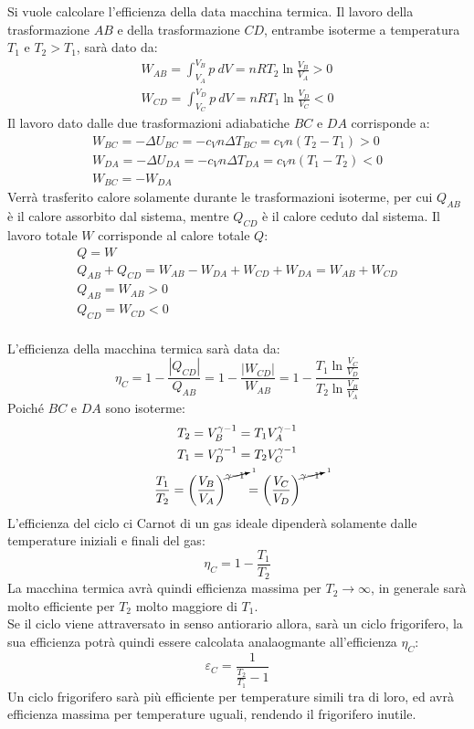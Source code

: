 \documentclass{article}
\numberwithin{equation}{subsection}
\begin{document}
Si vuole calcolare l'efficienza della data macchina termica. Il 
lavoro della trasformazione $AB$ e della trasformazione $CD$, entrambe isoterme a temperatura $T_1$ e $T_2>T_1$, sarà dato da: 
\begin{gather*}
    W_{AB}=\int_{V_A}^{V_B}p\:dV=nRT_2\ln\displaystyle\frac{V_B}{V_A}>0\\
    W_{CD}=\int_{V_C}^{V_D}p\:dV=nRT_1\ln\displaystyle\frac{V_D}{V_C}<0
\end{gather*}
Il lavoro dato dalle due trasformazioni adiabatiche $BC$ e $DA$ corrisponde a:
\begin{gather*}
    W_{BC}=-\Delta U_{BC}=-c_Vn\Delta T_{BC}=c_Vn(T_2-T_1)>0\\
    W_{DA}=-\Delta U_{DA}=-c_Vn\Delta T_{DA}=c_Vn(T_1-T_2)<0\\
    W_{BC}=-W_{DA}
\end{gather*}
Verrà trasferito calore solamente durante le trasformazioni isoterme, per cui 
$Q_{AB}$ è il calore assorbito dal sistema, mentre $Q_{CD}$ è il calore 
ceduto dal sistema. Il lavoro totale $W$ corrisponde al calore totale $Q$:
\begin{gather*}
    Q=W\\
    Q_{AB}+Q_{CD}=W_{AB}-W_{DA}+W_{CD}+W_{DA}=W_{AB}+W_{CD}\\
    Q_{AB}=W_{AB}>0\\
    Q_{CD}=W_{CD}<0
\end{gather*}
\\
L'efficienza della macchina termica sarà data da:
\begin{equation*}
    \eta_C=1-\displaystyle\frac{|Q_{CD}|}{Q_{AB}}=1-\frac{|W_{CD}|}{W_{AB}}=1-\frac{T_1\ln\displaystyle\frac{V_C}{V_D}}{T_2\ln\displaystyle\frac{V_B}{V_A}}
\end{equation*}
Poiché $BC$ e $DA$ sono isoterme:
\begin{gather*}
    T_2=V_B^{\gamma-1}=T_1V_A^{\gamma-1}\\
    T_1=V_D^{\gamma-1}=T_2V_C^{\gamma-1}\\
    \displaystyle\frac{T_1}{T_2}=\left(\frac{V_B}{V_A}\right)^{\cancelto{1}{\gamma-1}}=\left(\frac{V_C}{V_D}\right)^{\cancelto{1}{\gamma-1}}
\end{gather*}
L'efficienza del ciclo ci Carnot di un gas ideale dipenderà solamente dalle temperature iniziali e finali del gas:
\begin{equation}
    \eta_C=1-\displaystyle\frac{T_1}{T_2}
\end{equation}
La macchina termica avrà quindi efficienza massima per $T_2\to\infty$, 
in generale sarà molto efficiente per $T_2$ molto maggiore di $T_1$.
\\
Se il ciclo viene attraversato in senso antiorario allora, sarà un ciclo 
frigorifero, la sua efficienza potrà quindi essere calcolata 
analaogmante all'efficienza $\eta_C$:
\begin{equation}
    \varepsilon_C=\displaystyle\frac{1}{\displaystyle\frac{T_2}{T_1}-1}
\end{equation}
Un ciclo frigorifero sarà più efficiente per temperature simili tra di loro, 
ed avrà efficienza massima per temperature uguali, rendendo il frigorifero 
inutile. 
\end{document}
